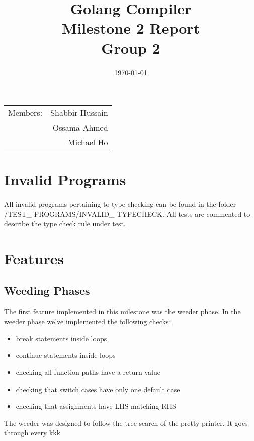 \documentclass{article}
\title{Golang Compiler\\ Milestone 2 Report\\ Group 2} %
\date{\today} %
\begin{document}
\maketitle %

\begin{center}
\begin{tabular}{l r}
Members: & Shabbir Hussain \\ %
& Ossama Ahmed \\ %
& Michael Ho \\ \end{tabular}
\end{center}

\section{Invalid Programs}
All invalid programs pertaining to type checking can be found in the folder /TEST\_ PROGRAMS/INVALID\_ TYPECHECK. All tests are commented to describe the type check rule under test.

\section{Features}

\subsection{Weeding Phases}
The first feature implemented in this milestone was the weeder phase. In the weeder phase we've implemented the following checks:
\begin{itemize}
\item break statements inside loops
\item continue statements inside loops
\item checking all function paths have a return value
\item checking that switch cases have only one default case
\item checking that assignments have LHS matching RHS
\end{itemize}

The weeder was designed to follow the tree search of the pretty printer. It goes through every kkk
\end{document}

